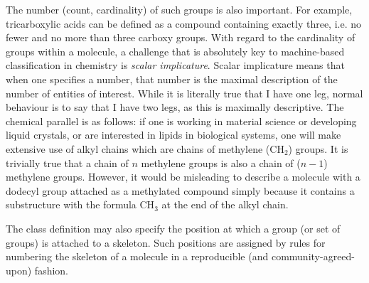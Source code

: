 \documentclass[10pt]{bmc_article}
\newenvironment{bmcformat}{\baselineskip20pt\sloppy\setboolean{publ}{false}}{\baselineskip20pt\sloppy}
\begin{document}
\begin{bmcformat}
The number (count, cardinality) of such groups is also important.  For example, tricarboxylic acids can be defined as a compound containing exactly three, i.e. no fewer and no more than three carboxy groups.  With regard to the cardinality of groups within a molecule, a challenge that is absolutely key to machine-based classification in chemistry is \textit{scalar implicature}. Scalar implicature means that when one specifies a number, that number is the maximal description of the number of entities of interest. While it is literally true that I have one leg, normal behaviour is to say that I have two legs, as this is maximally descriptive. The chemical parallel is as follows: if one is working in material science or developing liquid crystals, or are interested in lipids in biological systems, one will make extensive use of alkyl chains which are chains of methylene (CH$_2$) groups.  It is trivially true that a chain of $n$ methylene groups is also a chain of ($n-1$) methylene groups.  However, it would be misleading to describe a molecule with a dodecyl group attached as a methylated compound simply because it contains a substructure with the formula CH$_3$ at the end of the alkyl chain. 


The class definition may also specify the position at which a group (or set of groups) is attached to a skeleton. Such positions are assigned by rules for numbering the skeleton of a molecule in a reproducible (and community-agreed-upon) fashion.  %


\end{bmcformat}
\end{document}
